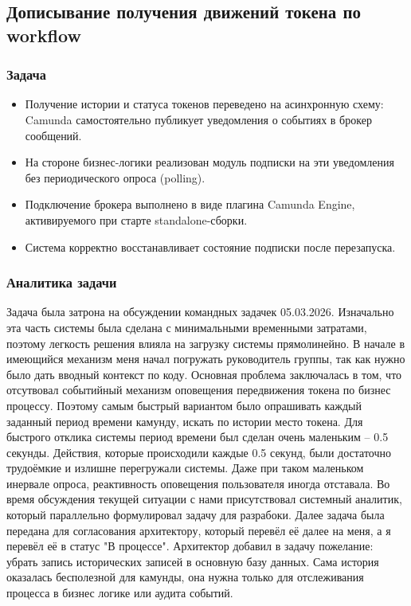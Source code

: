 \subsection{Дописывание получения движений токена по workflow}

\subsubsection{Задача}
\begin{itemize}
  \item Получение истории и статуса токенов переведено на асинхронную схему: Camunda самостоятельно публикует уведомления о событиях в брокер сообщений. 
  \item На стороне бизнес-логики реализован модуль подписки на эти уведомления без периодического опроса (polling).
  \item Подключение брокера выполнено в виде плагина Camunda Engine, активируемого при старте standalone-сборки. 
  \item Система корректно восстанавливает состояние подписки после перезапуска.
\end{itemize}

\subsubsection{Аналитика задачи}

Задача была затрона на обсуждении командных задачек 05.03.2026. 
Изначально эта часть системы была сделана с минимальными временными затратами,
поэтому легкость решения влияла на загрузку системы прямолинейно. 
В начале в имеющийся механизм меня начал погружать руководитель группы, так как нужно было дать вводный контекст по коду.
Основная проблема заключалась в том, что отсутвовал событийный механизм оповещения передвижения токена по бизнес процессу. 
Поэтому самым быстрый вариантом было опрашивать каждый заданный период времени камунду, искать по истории место токена. 
Для быстрого отклика системы период времени был сделан очень маленьким -- 0.5 секунды. Действия, которые происходили каждые 0.5 секунд, 
были достаточно трудоёмкие и излишне перегружали системы. 
Даже при таком маленьком инервале опроса, реактивность оповещения пользователя иногда отставала.
Во время обсуждения текущей ситуации с нами присутствовал системный аналитик, который параллельно формулировал задачу для разрабоки.
Далее задача была передана для согласования архитектору, который перевёл её далее на меня, а я перевёл её в статус "В процессе".
Архитектор добавил в задачу пожелание: убрать запись исторических записей в основную базу данных. Сама история оказалась бесполезной для камунды, 
она нужна только для отслеживания процесса в бизнес логике или аудита событий.

